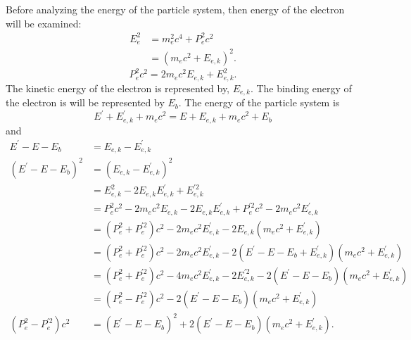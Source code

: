 Before analyzing the energy of the particle system, then energy of the 
electron will be examined: 
\begin{align}
  E_e^2 & = m_e^2c^4 + P_e^2c^2 \nonumber \\
  & = \left(m_ec^2 + E_{e,k}\right)^2. \nonumber
\end{align}
\begin{equation}
  P_e^2c^2 = 2m_ec^2E_{e,k} + E_{e,k}^2.
\end{equation}
The kinetic energy of the electron is represented by, $E_{e,k}$. The binding 
energy of the electron is will be represented by $E_b$.
The energy of the particle system is 
\begin{equation*}
  E^{'} + E_{e,k}^{'} + m_ec^2 = E + E_{e,k} + m_ec^2 + E_b
\end{equation*}
and 
\begin{align}
  E^{'}-E-E_b & = E_{e,k} - E_{e,k}^{'} \nonumber \\
  \left(E^{'}-E-E_b\right)^2 & = \left(E_{e,k} - E_{e,k}^{'}\right)^2 \nonumber \\
  & = E_{e,k}^2 - 2E_{e,k}E_{e,k}^{'} + E_{e,k}^{'2} \nonumber \\
  & = P_e^2c^2 - 2m_ec^2E_{e,k} - 2E_{e,k}E_{e,k}^{'} + P_e^{'2}c^2 - 2m_ec^2E_{e,k}^{'}
  \nonumber \\
  & = \left(P_e^2 + P_e^{'2}\right)c^2 - 2m_ec^2E_{e,k}^{'} - 
  2E_{e,k}\left(m_ec^2 + E_{e,k}^{'}\right) \nonumber \\
  & = \left(P_e^2 + P_e^{'2}\right)c^2 - 2m_ec^2E_{e,k}^{'} - 
  2\left(E^{'}-E-E_b+E_{e,k}^{'}\right)\left(m_ec^2 + E_{e,k}^{'}\right) \nonumber\\
  & = \left(P_e^2 + P_e^{'2}\right)c^2 - 4m_ec^2E_{e,k}^{'} - 2E_{e,k}^{'2} -
  2\left(E^{'}-E-E_b\right)\left(m_ec^2 + E_{e,k}^{'}\right) \nonumber \\
  & = \left(P_e^2 - P_e^{'2}\right)c^2 -
  2\left(E^{'}-E-E_b\right)\left(m_ec^2 + E_{e,k}^{'}\right) \nonumber \\
  \left(P_e^2 - P_e^{'2}\right)c^2 & = \left(E^{'}-E-E_b\right)^2 +
  2\left(E^{'}-E-E_b\right)\left(m_ec^2 + E_{e,k}^{'}\right).
\end{align}

